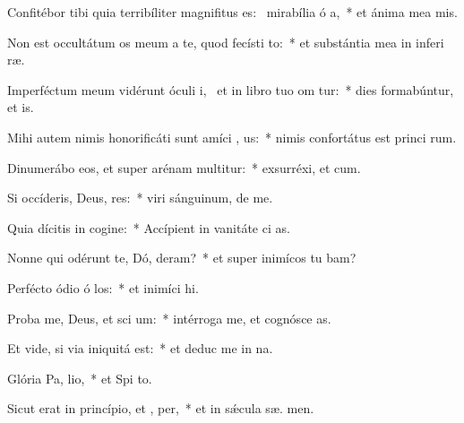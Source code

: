 \item Confitébor tibi quia terribíliter magnifitus es:~\pscross{} mirabília ó a,~* et ánima mea  mis.
\item Non est occultátum os meum a te, quod fecísti  to:~* et substántia mea in inferi ræ.
\item Imperféctum meum vidérunt óculi i,~\pscross{} et in libro tuo om tur:~* dies formabúntur, et   is.
\item Mihi autem nimis honorificáti sunt amíci , us:~* nimis confortátus est princi rum.
\item Dinumerábo eos, et super arénam multitur:~* exsurréxi, et   cum.
\item Si occíderis, Deus, res:~* viri sánguinum, de  me.
\item Quia dícitis in cogine:~* Accípient in vanitáte ci as.
\item Nonne qui odérunt te, Dó, deram?~* et super inimícos tu bam?
\item Perfécto ódio ó los:~* et inimíci   hi.
\item Proba me, Deus, et sci  um:~* intérroga me, et cognósce  as.
\item Et vide, si via iniquitá   est:~* et deduc me in  na.
\item Glória Pa,  lio,~* et Spi to.
\item Sicut erat in princípio, et ,  per,~* et in sǽcula sæ. men.

